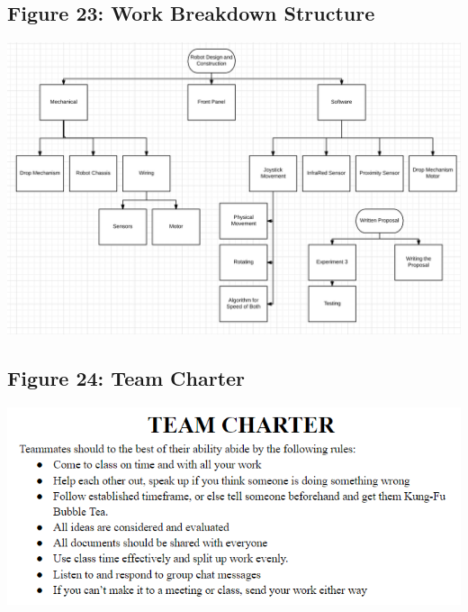 \documentclass{article}
\begin{document}
\subsection{Figure 23: Work Breakdown Structure}
\includegraphics[width=\textwidth]{WorkBreakdown.png}

\subsection{Figure 24: Team Charter}
\includegraphics[width=\textwidth]{TeamCharter.png}
\end{document}
